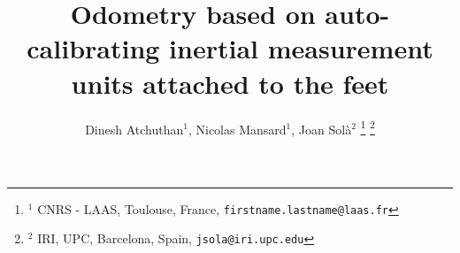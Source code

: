 \documentclass[letterpaper, 10 pt, conference]{ieeeconf}  %
\title{\LARGE \bf
Odometry based on auto-calibrating inertial measurement units attached to the feet
}
\author{Dinesh Atchuthan$^{1}$, Nicolas Mansard$^1$, Joan Sol\`a$^2$%
\thanks{$^{1}$ CNRS - LAAS, Toulouse, France, \tt {\small firstname.lastname@laas.fr}}%
\thanks{$^{2}$ IRI, UPC, Barcelona, Spain, \tt{\small jsola@iri.upc.edu}}
}
\begin{document}
\maketitle
\thispagestyle{empty}
\pagestyle{empty}

\begin{abstract}
\end{abstract}








\end{document}
